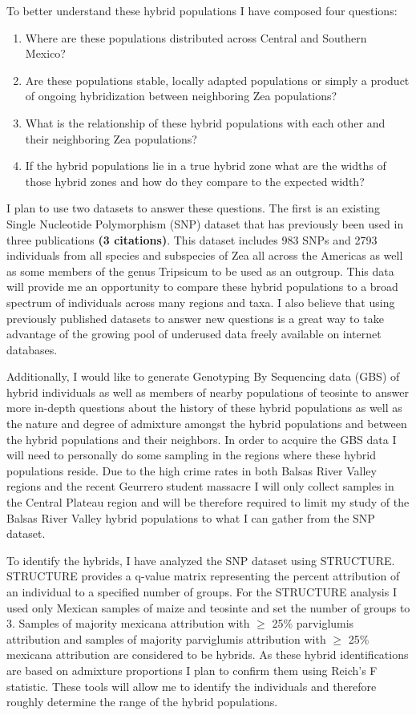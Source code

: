 \documentclass[12pt]{amsart}
\begin{document}
To better understand these hybrid populations I have composed four questions: 
\begin{enumerate} 
	\item Where are these populations distributed across Central and Southern Mexico? 
	\item Are these populations stable, locally adapted populations or simply a product of ongoing hybridization between neighboring Zea populations?
	\item What is the relationship of these hybrid populations with each other and their neighboring Zea populations?
	\item If the hybrid populations lie in a true hybrid zone what are the widths of those hybrid zones and how do they compare to the expected width?
\end{enumerate} 

I plan to use two datasets to answer these questions.  
The first is an existing Single Nucleotide Polymorphism (SNP) dataset that has previously been used in three publications \textbf{(3 citations)}.  
This dataset includes 983 SNPs and 2793 individuals from all species and subspecies of Zea all across the Americas as well as some members of the genus Tripsicum to be used as an outgroup.  
This data will provide me an opportunity to compare these hybrid populations to a broad spectrum of individuals across many regions and taxa.  
I also believe that using previously published datasets to answer new questions is a great way to take advantage of the growing pool of underused data freely available on internet databases.  

Additionally, I would like to generate Genotyping By Sequencing data (GBS) of hybrid individuals as well as members of nearby populations of teosinte to answer more in-depth questions about the history of these hybrid populations as well as the nature and degree of admixture amongst the hybrid populations and between the hybrid populations and their neighbors.  
In order to acquire the GBS data I will need to personally do some sampling in the regions where these hybrid populations reside.  
Due to the high crime rates in both Balsas River Valley regions and the recent Geurrero student massacre I will only collect samples in the Central Plateau region and will be therefore required to limit my study of the Balsas River Valley hybrid populations to what I can gather from the SNP dataset.

To identify the hybrids, I have analyzed the SNP dataset using STRUCTURE.  STRUCTURE provides a q-value matrix representing the percent attribution of an individual to a specified number of groups.  
For the STRUCTURE analysis I used only Mexican samples of maize and teosinte and set the number of groups to 3.
Samples of majority mexicana attribution with $\geq$ 25\% parviglumis attribution and samples of majority parviglumis attribution with $\geq$ 25\% mexicana attribution are considered to be hybrids.
As these hybrid identifications are based on admixture proportions I plan to confirm them using Reich's F statistic.
These tools will allow me to identify the individuals and therefore roughly determine the range of the hybrid populations.
\end{document}

